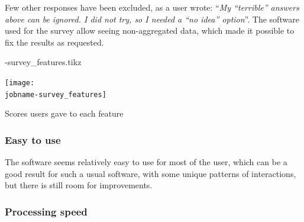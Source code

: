 \documentclass{Configuration_Files/PoliMi3i_thesis}
\begin{document}
Few other responses have been excluded, as a user wrote: “\textit{My “terrible” answers above can be ignored. I did not try, so I needed a “no idea” option}”. The software used for the survey allow seeing non-aggregated data, which made it possible to fix the results as requested.

\featurestables

\begin{filecontents}[overwrite]{\jobname-survey_features.tikz}
\end{filecontents}

\begin{graph}
  \texttt{[image: \\jobname-survey\_features]}
  \caption{Scores users gave to each feature}
  \label{graph:survey_features}
\end{graph}

\subsubsection{Easy to use}

The software seems relatively easy to use for most of the user, which can be a good result for such a usual software, with some unique patterns of interactions, but there is still room for improvements.

\subsubsection{Processing speed}
\end{document}
